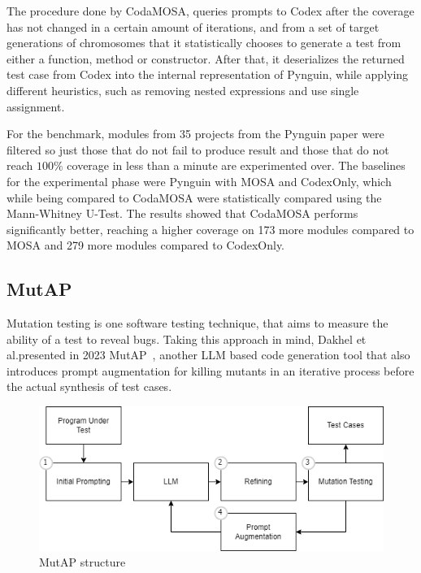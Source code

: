 \documentclass[%
  chapterprefix=false,%
  open=right,%
  twoside=true,%
  paper=a4,%
  logofile={Figures/logo.png},%
  thesistype=master,%
  UKenglish,%
]{se2thesis}
\begin{document}
The procedure done by CodaMOSA, queries prompts to Codex after the coverage has not changed in a certain amount of iterations, and from a set of target generations of chromosomes that it statistically chooses to generate a test from either a function, method or constructor.
After that, it deserializes the returned test case from Codex into the internal representation of Pynguin, while applying different heuristics, such as removing nested expressions and use single assignment.

For the benchmark, modules from 35 projects from the Pynguin paper were filtered so just those that do not fail to produce result and those that do not reach \(100\%\) coverage in less than a minute are experimented over.
The baselines for the experimental phase were Pynguin with MOSA and CodexOnly, which while being compared to CodaMOSA were statistically compared using the Mann-Whitney U-Test.
The results showed that CodaMOSA performs significantly better, reaching a higher coverage on 173 more modules compared to MOSA and 279 more modules compared to CodexOnly.

\subsection*{MutAP}

Mutation testing is one software testing technique, that aims to measure the ability of a test to reveal bugs.
Taking this approach in mind, Dakhel et al.\@ presented in 2023 MutAP~\cite{DBLP:journals/corr/abs-2308-16557}, another LLM based code generation tool that also introduces prompt augmentation for killing mutants in an iterative process before the actual synthesis of test cases.

\begin{figure}[tb]
  \centering 
  \includegraphics[width=.99\textwidth]{Figures/mutap.png}
  \caption{MutAP structure}\label{fig:mutap}
\end{figure}
\end{document}
